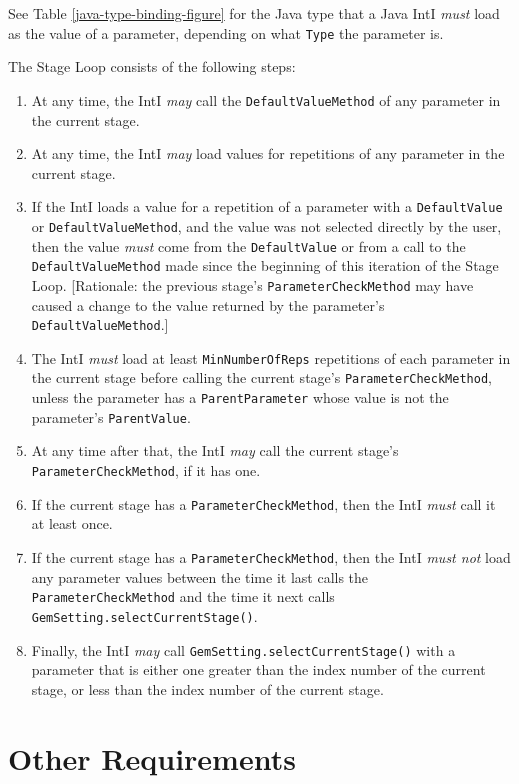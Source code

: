 \documentclass[11pt]{article}
\newcommand{\must}{{\it must}}
\newcommand{\mustnot}{{\it must not}}
\newcommand{\may}{{\it may}}
\newcounter{coreReq}
\begin{document}
\noindent
See Table \ref{java-type-binding-figure} for the Java type that a Java
IntI {\must} load as the value of a parameter, depending on what {\tt Type}
the parameter is.

\newpage

\noindent
The Stage Loop consists of the following steps:
\begin{enumerate}
\setcounter{enumi}{\value{coreReq}}
\item At any time, the IntI {\may} call the
  {\tt DefaultValueMethod} of any parameter in the current
  stage.
\item At any time, the IntI {\may} load values for
  repetitions of any parameter in the current stage.
\item If the IntI loads a value for a repetition of a parameter
  with a {\tt DefaultValue} or {\tt DefaultValueMethod}, and the
  value was not selected directly by the user, then the value {\must} come
  from the {\tt DefaultValue} or from a call to the
  {\tt DefaultValueMethod} made since the beginning of this iteration of
  the Stage Loop.  [Rationale: the previous stage's
  {\tt ParameterCheckMethod} may have caused a change to the value
  returned by the parameter's {\tt DefaultValueMethod}.]
\item The IntI {\must} load at least {\tt MinNumberOfReps}
  repetitions of each parameter in the current stage before calling
  the current stage's {\tt ParameterCheckMethod},
  unless the parameter has a {\tt ParentParameter} whose value is
  not the parameter's {\tt ParentValue}.
\item At any time after that, the IntI {\may} call the
  current stage's {\tt ParameterCheckMethod}, if it has one.
\item If the current stage has a {\tt ParameterCheckMethod},
  then the IntI {\must} call it at least once.
\item If the current stage has a {\tt ParameterCheckMethod}, then
  the IntI {\mustnot} load any parameter values between the time
  it last calls the {\tt ParameterCheckMethod} and the time it next
  calls {\tt GemSetting.selectCurrentStage()}.
\item Finally, the IntI {\may} call {\tt GemSetting.selectCurrentStage()}
  with a parameter that is either one greater than the index number of the
  current stage, or less than the index number of the current stage.
\setcounter{coreReq}{\value{enumi}}
\end{enumerate}

\section{Other Requirements}
\end{document}
